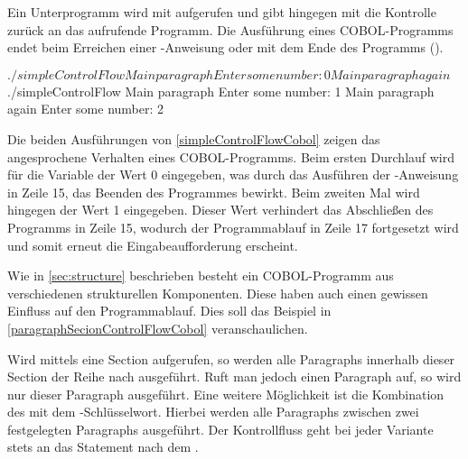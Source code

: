 Ein Unterprogramm wird mit  aufgerufen und gibt hingegen mit  die Kontrolle zurück an das aufrufende Programm. Die Ausführung eines COBOL-Programms endet beim Erreichen einer -Anweisung oder mit dem Ende des Programms (). 

\sepCodeAndOutputCheck
\begin{shellwindow}
$ ./simpleControlFlow 
Main paragraph
Enter some number: 0
Main paragraph again
$ ./simpleControlFlow 
Main paragraph
Enter some number: 1 
Main paragraph again
Enter some number: 2
\end{shellwindow}

Die beiden Ausführungen von \autoref{simpleControlFlowCobol} zeigen das angesprochene Verhalten eines COBOL-Programms. Beim ersten Durchlauf wird für die Variable  der Wert 0 eingegeben, was durch das Ausführen der -Anweisung in Zeile 15, das Beenden des Programmes bewirkt. Beim zweiten Mal wird hingegen der Wert 1 eingegeben. Dieser Wert verhindert das Abschließen des Programms in Zeile 15, wodurch der Programmablauf in Zeile 17 fortgesetzt wird und somit erneut die Eingabeaufforderung erscheint.

Wie in \autoref{sec:structure} beschrieben besteht ein COBOL-Programm aus verschiedenen strukturellen Komponenten. Diese haben auch einen gewissen Einfluss auf den Programmablauf. Dies soll das Beispiel in \autoref{paragraphSecionControlFlowCobol} veranschaulichen.

\sepCodeAndOutputCheck
{}

Wird mittels  eine Section aufgerufen, so werden alle Paragraphs innerhalb dieser Section der Reihe nach ausgeführt. Ruft man jedoch einen Paragraph auf, so wird nur dieser Paragraph ausgeführt. Eine weitere Möglichkeit ist die Kombination des  mit dem -Schlüsselwort. Hierbei werden alle Paragraphs zwischen zwei festgelegten Paragraphs ausgeführt. Der Kontrollfluss geht bei jeder Variante stets an das Statement nach dem .


